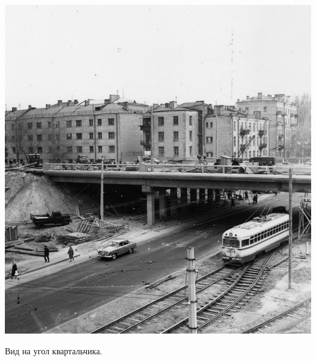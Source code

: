 \documentclass[a5paper,11pt,openany]{article}
\begin{document}
\vspace*{\fill}


\newpage

\vspace*{\fill}



\begin{center}
\includegraphics[width=\linewidth]{1963.jpg}

Вид на угол квартальчика.
\end{center}

\vspace*{\fill}

\newpage




%

\begin{thebibliography}{999}

\end{thebibliography}
\end{document}
